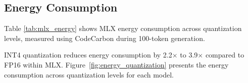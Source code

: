 \documentclass[conference]{IEEEtran}
\begin{document}
\subsection{Energy Consumption}

Table \ref{tab:mlx_energy} shows MLX energy consumption across quantization levels, measured using CodeCarbon during 100-token generation.

\begin{table}[t]
\centering
\caption{MLX energy comparison across quantization levels (100 tokens).}
\label{tab:mlx_energy}
\end{table}

INT4 quantization reduces energy consumption by 2.2$\times$ to 3.9$\times$ compared to FP16 within MLX. Figure~\ref{fig:energy_quantization} presents the energy consumption across quantization levels for each model.
\end{document}
